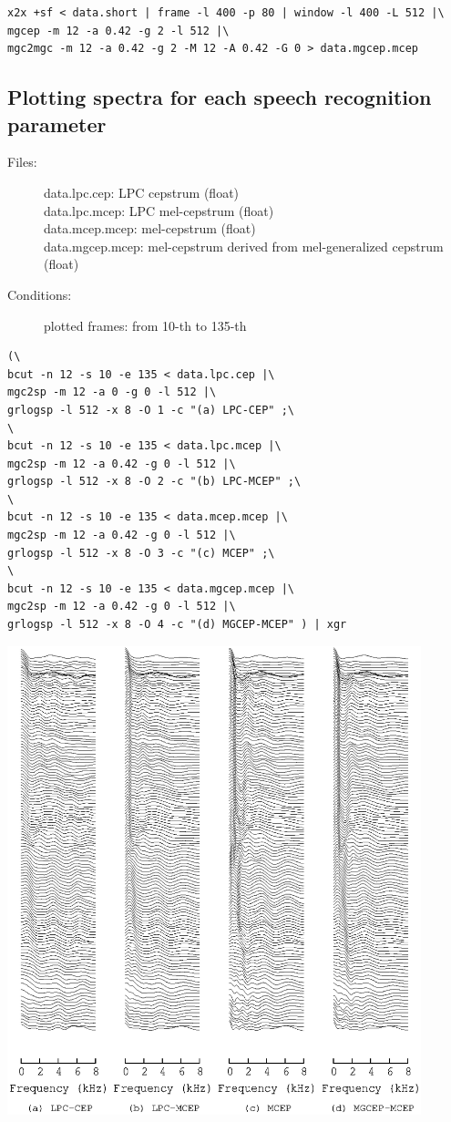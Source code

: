 \documentclass[a4paper,10pt]{article}
\begin{document}
\begin{verbatim}
x2x +sf < data.short | frame -l 400 -p 80 | window -l 400 -L 512 |\
mgcep -m 12 -a 0.42 -g 2 -l 512 |\
mgc2mgc -m 12 -a 0.42 -g 2 -M 12 -A 0.42 -G 0 > data.mgcep.mcep
\end{verbatim}

\subsection{Plotting spectra for each speech recognition parameter}

\begin{description}
\item[Files:]
  data.lpc.cep: LPC cepstrum (float)\\
  data.lpc.mcep: LPC mel-cepstrum (float)\\
  data.mcep.mcep: mel-cepstrum  (float)\\
  data.mgcep.mcep: mel-cepstrum derived from mel-generalized cepstrum (float)
\item[Conditions:]
  plotted frames: from 10-th to 135-th\\
\end{description}

\begin{verbatim}
(\
bcut -n 12 -s 10 -e 135 < data.lpc.cep |\
mgc2sp -m 12 -a 0 -g 0 -l 512 |\
grlogsp -l 512 -x 8 -O 1 -c "(a) LPC-CEP" ;\
\
bcut -n 12 -s 10 -e 135 < data.lpc.mcep |\
mgc2sp -m 12 -a 0.42 -g 0 -l 512 |\
grlogsp -l 512 -x 8 -O 2 -c "(b) LPC-MCEP" ;\
\
bcut -n 12 -s 10 -e 135 < data.mcep.mcep |\
mgc2sp -m 12 -a 0.42 -g 0 -l 512 |\
grlogsp -l 512 -x 8 -O 3 -c "(c) MCEP" ;\
\
bcut -n 12 -s 10 -e 135 < data.mgcep.mcep |\
mgc2sp -m 12 -a 0.42 -g 0 -l 512 |\
grlogsp -l 512 -x 8 -O 4 -c "(d) MGCEP-MCEP" ) | xgr
\end{verbatim}

\includegraphics[width=12cm]{data.all.mcep.grlogsp.eps}
\end{document}
